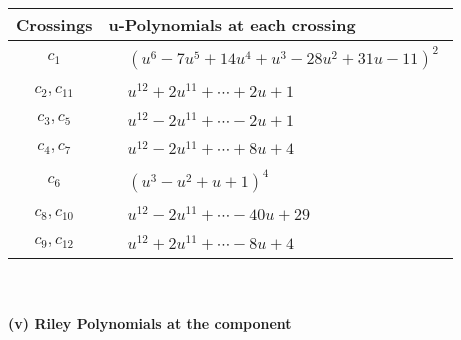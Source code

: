 \documentclass[1p]{elsarticle_modified}
\theoremstyle{definition}
\begin{document}
\begin{tabular}{m{50pt}|m{274pt}}
Crossings & \hspace{64pt}u-Polynomials at each crossing \\
\hline $$\begin{aligned}c_{1}\end{aligned}$$&$\begin{aligned}
&(u^6-7 u^5+14 u^4+u^3-28 u^2+31 u-11)^2
\end{aligned}$\\
\hline $$\begin{aligned}c_{2},c_{11}\end{aligned}$$&$\begin{aligned}
&u^{12}+2 u^{11}+\cdots+2 u+1
\end{aligned}$\\
\hline $$\begin{aligned}c_{3},c_{5}\end{aligned}$$&$\begin{aligned}
&u^{12}-2 u^{11}+\cdots-2 u+1
\end{aligned}$\\
\hline $$\begin{aligned}c_{4},c_{7}\end{aligned}$$&$\begin{aligned}
&u^{12}-2 u^{11}+\cdots+8 u+4
\end{aligned}$\\
\hline $$\begin{aligned}c_{6}\end{aligned}$$&$\begin{aligned}
&(u^3- u^2+u+1)^4
\end{aligned}$\\
\hline $$\begin{aligned}c_{8},c_{10}\end{aligned}$$&$\begin{aligned}
&u^{12}-2 u^{11}+\cdots-40 u+29
\end{aligned}$\\
\hline $$\begin{aligned}c_{9},c_{12}\end{aligned}$$&$\begin{aligned}
&u^{12}+2 u^{11}+\cdots-8 u+4
\end{aligned}$\\
\hline
\end{tabular}\\~\\
\newpage\renewcommand{\arraystretch}{1}
\flushleft \textbf{(v) Riley Polynomials at the component}\newline \\
\end{document}
